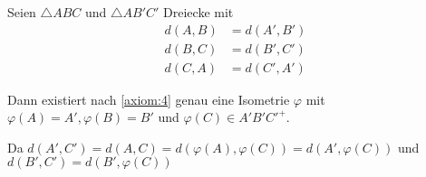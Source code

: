 \begin{solution}[\ref{ub-tut-24:a3}]
    Seien $\triangle ABC$ und $\triangle AB' C'$ Dreiecke mit
    \begin{align*}
        d(A, B)  &= d(A', B')\\
        d(B, C)  &= d(B', C')\\
        d(C, A)  &= d(C', A')
    \end{align*}

    Dann existiert nach \ref{axiom:4} genau eine Isometrie $\varphi$
    mit $\varphi(A) = A', \varphi(B) = B'$ und $\varphi(C) \in A' B' C'^+$.

    Da $d(A',C') = d(A,C) = d(\varphi(A), \varphi(C)) = d(A', \varphi(C))$
    und $d(B', C') = d(B', \varphi(C))$
\end{solution}
